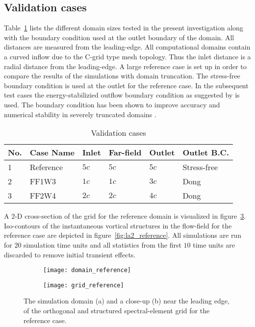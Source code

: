 \subsection{Validation cases}

Table~\ref{table:validation_cases} lists the different domain sizes tested in the present investigation along with the boundary condition used at the outlet boundary of the domain. All distances are measured from the leading-edge. All computational domains contain a curved inflow due to the C-grid type mesh topology. Thus the inlet distance is a radial distance from the leading-edge. A large reference case is set up in order to compare the results of the simulations with domain truncation. The stress-free boundary condition is used at the outlet for the reference case. In the subsequent test cases the energy-stabilizied outflow boundary condition as suggested by \cite{dong2014} is used. The boundary condition has been shown to improve accuracy and numerical stability in severely truncated domains \citep{dong2014}. 
\begin{table}[h]
	\centering
	\begin{tabular}{llllll}
		No. & Case Name	& Inlet & Far-field & Outlet & Outlet B.C. \\
		\hline
		\hline
		1 & Reference	& $5c$ & $5c$ & $5c$ & Stress-free \\
		2 & FF1W3	& $1c$ & $1c$ & $3c$ & Dong \\
		3 & FF2W4	& $2c$ & $2c$ & $4c$ & Dong
	\end{tabular}
	\vspace{5pt}
	\caption{Validation cases}
	\label{table:validation_cases}	
\end{table}
A 2-D cross-section of the grid for the reference domain is visualized in figure~\ref{fig:domain_grid_reference}. Iso-contours of the instantaneous vortical structures in the flow-field for the reference case are depicted in figure~\ref{fig:la2_reference}. All simulations are run for $20$ simulation time units and all statistics from the first $10$ time units are discarded to remove initial transient effects.
\begin{figure}[h]
	\centering
	\begin{subfigure}[b]{0.49\textwidth}
		\centering
		\texttt{[image: domain\_reference]}
		\caption{}
		\label{fig:domain_reference}
	\end{subfigure}
	\begin{subfigure}[b]{0.49\textwidth}
		\centering
		\texttt{[image: grid\_reference]}
		\caption{}
		\label{fig:grid_reference}
	\end{subfigure}
	\vspace{10pt}
	\caption{The simulation domain (a) and a close-up (b) near the leading edge, of the orthogonal and structured spectral-element grid for the reference case.}
	\label{fig:domain_grid_reference}
\end{figure}

